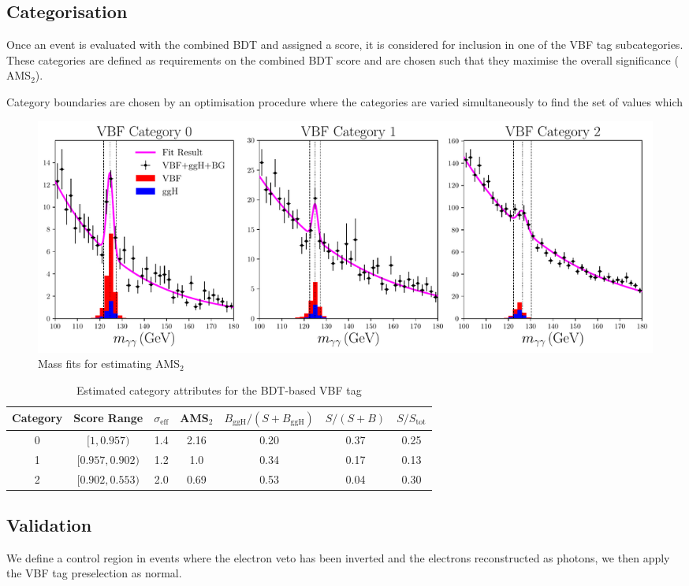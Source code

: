 \subsection{Categorisation}
Once an event is evaluated with the combined BDT and assigned a score, it is considered for inclusion in one of the VBF tag subcategories.
These categories are defined as requirements on the combined BDT score and are chosen such that they maximise the overall significance ($\mathrm{AMS}_2$).

Category boundaries are chosen by an optimisation procedure where the categories are varied simultaneously to find the set of values which 

\begin{figure}[h!]
    \includegraphics[width=1.0\textwidth]{figures/event_selection/BDT_mass_fits.pdf}
    \caption{Mass fits for estimating AMS$_2$}
    \label{fig:event_categorisaton:bdt_mass_fits}
\end{figure}


\begin{table}[h!]
    \begin{tabular}{ c || c | c | c | c | c | c }
        Category & Score Range & $\sigma_{\mathrm{eff}}$ & AMS$_2$ & $B_{\mathrm{ggH}}/(S+B_{\mathrm{ggH}})$ & $S/(S+B)$ & $S/S_{\mathrm{tot}}$ \\
        \hline
        0 & $[1, 0.957)$     & 1.4 &  2.16 & 0.20 & 0.37 & 0.25 \\
        1 & $[0.957, 0.902)$ & 1.2 &  1.0  & 0.34 & 0.17 & 0.13 \\
        2 & $[0.902, 0.553)$ & 2.0 &  0.69 & 0.53 & 0.04 & 0.30 \\
\end{tabular}
    \caption{Estimated category attributes for the BDT-based VBF tag}
    \label{tab:event_selection:legacy_cats}
\end{table}



\subsection{Validation}
We define a control region in \Zee events where the electron veto has been inverted and the electrons reconstructed as photons, we then apply the VBF tag preselection as normal.

